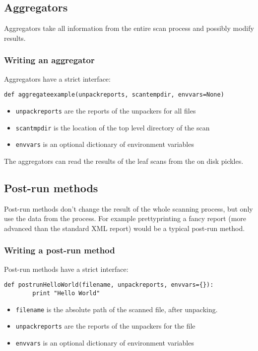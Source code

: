 \documentclass[10pt]{article}
\begin{document}
\subsection{Aggregators}

Aggregators take all information from the entire scan process and possibly
modify results.

\subsubsection{Writing an aggregator}

Aggregators have a strict interface:

\begin{verbatim}
def aggregateexample(unpackreports, scantempdir, envvars=None)
\end{verbatim}

\begin{itemize}
\item \texttt{unpackreports} are the reports of the unpackers for all files
\item \texttt{scantmpdir} is the location of the top level directory of the
scan
\item \texttt{envvars} is an optional dictionary of environment variables
\end{itemize}

The aggregators can read the results of the leaf scans from the on disk
pickles.

\subsection{Post-run methods}

Post-run methods don't change the result of the whole scanning process, but
only use the data from the process. For example prettyprinting a fancy report
(more advanced than the standard XML report) would be a typical post-run
method.

\subsubsection{Writing a post-run method}

Post-run methods have a strict interface:

\begin{verbatim}
def postrunHelloWorld(filename, unpackreports, envvars={}):
        print "Hello World"
\end{verbatim}

\begin{itemize}
\item \texttt{filename} is the absolute path of the scanned file, after
unpacking.
\item \texttt{unpackreports} are the reports of the unpackers for the file
\item \texttt{envvars} is an optional dictionary of environment variables
\end{itemize}
\end{document}

